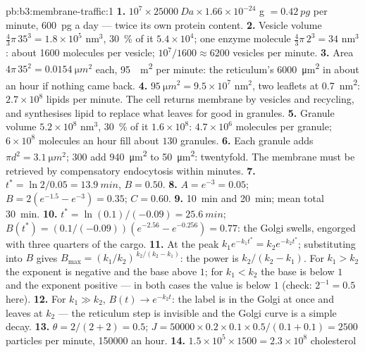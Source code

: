\begin{solution}{pb:b3:membrane-traffic:1}
\textbf{1.} $10^{7}\times \qty{25000}{Da}\times 1.66\times 10^{-24}$ g
$= \qty{0.42}{pg}$ per minute, \qty{600}{pg} a day --- twice its own
protein content.
\textbf{2.} Vesicle volume $\tfrac{4}{3}\pi\,35^{3} = 1.8\times 10^{5}$
nm$^{3}$, \qty{30}{\%} of it $5.4\times 10^{4}$; one enzyme molecule
$\tfrac{4}{3}\pi\,2^{3} = 34$ nm$^{3}$: about \num{1600} molecules per
vesicle; $10^{7}/1600 \approx 6200$ vesicles per minute.
\textbf{3.} Area $4\pi\,35^{2} = \qty{0.0154}{\micro m^2}$ each, \qty{95}{\micro
m^2} per minute: the reticulum's \qty{6000}{\micro m^2} in about an
hour if nothing came back.
\textbf{4.} $\qty{95}{\micro m^2} = 9.5\times 10^{7}$ nm$^{2}$, two leaflets
at \qty{0.7}{nm^2}: $2.7\times 10^{8}$ lipids per minute. The cell
returns membrane by  vesicles and recycling, and synthesises lipid
to replace what leaves for good in granules.
\textbf{5.} Granule volume $5.2\times 10^{8}$ nm$^{3}$, \qty{30}{\%} of it
$1.6\times 10^{8}$: $4.7\times 10^{6}$ molecules per granule; $6\times
10^{8}$ molecules an hour fill about $130$ granules.
\textbf{6.} Each granule adds $\pi d^{2} = \qty{3.1}{\micro m^2}$; $300$
add \qty{940}{\micro m^2} to \qty{50}{\micro m^2}: twentyfold. The
membrane must be retrieved by compensatory endocytosis within minutes.
\textbf{7.} $t^{*} = \ln 2/0.05 = \qty{13.9}{min}$, $B = 0.50$.
\textbf{8.} $A = e^{-3} = 0.05$; $B = 2(e^{-1.5} - e^{-3}) = 0.35$;
$C = 0.60$.
\textbf{9.} \qty{10}{min} and \qty{20}{min}; mean total \qty{30}{min}.
\textbf{10.} $t^{*} = \ln(0.1)/(-0.09) = \qty{25.6}{min}$; $B(t^{*}) =
(0.1/(-0.09))(e^{-2.56} - e^{-0.256}) = 0.77$: the Golgi swells,
engorged with three quarters of the cargo.
\textbf{11.} At the peak $k_{1}e^{-k_{1}t^{*}} = k_{2}e^{-k_{2}t^{*}}$;
substituting into $B$ gives $B_{\max} = (k_{1}/k_{2})^{\,k_{2}/(k_{2} -
k_{1})}$: the power is $k_{2}/(k_{2} - k_{1})$. For $k_{1} > k_{2}$ the
exponent is negative and the base above $1$; for $k_{1} < k_{2}$ the
base is below $1$ and the exponent positive --- in both cases the value
is below $1$ (check: $2^{-1} = 0.5$ here).
\textbf{12.} For $k_{1} \gg k_{2}$, $B(t) \to e^{-k_{2}t}$: the label
is in the Golgi at once and leaves at $k_{2}$ --- the reticulum step is
invisible and the Golgi curve is a simple decay.
\textbf{13.} $\theta = 2/(2+2) = 0.5$; $J = \num{50000}\times 0.2\times
0.1\times 0.5/(0.1 + 0.1) = 2500$ particles per minute, \num{150000} an
hour.
\textbf{14.} $1.5\times 10^{5}\times 1500 = 2.3\times 10^{8}$ cholesterol

\end{solution}
